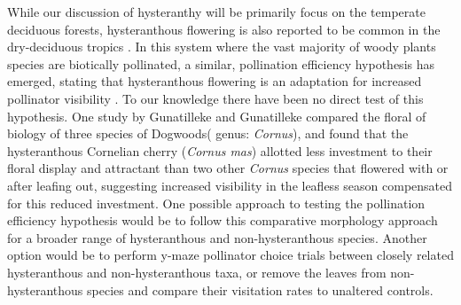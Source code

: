 \documentclass{article}\usepackage[]{graphicx}\usepackage[]{color}
\begin{document}
\indent While our discussion of hysteranthy will be primarily focus on the temperate deciduous forests, hysteranthous flowering is also reported to be common in the dry-deciduous tropics \citep{Janzen1967}. In this system where the vast majority of woody plants species are biotically pollinated, a similar, pollination efficiency hypothesis has emerged, stating that hysteranthous flowering is an adaptation for increased pollinator visibility \citep{Janzen1967}. To our knowledge there have been no direct test of this hypothesis. One study by Gunatilleke and Gunatilleke \citeyear{Guantilleke1984} compared the floral of biology of three species of Dogwoods( genus: \textit{Cornus}), and found that the hysteranthous Cornelian cherry (\textit{Cornus mas}) allotted less investment to their floral display and attractant than two other \textit{Cornus} species that flowered with or after leafing out, suggesting increased visibility in the leafless season compensated for this reduced investment. One possible approach to testing the pollination efficiency hypothesis would be to follow this comparative morphology approach for a broader range of hysteranthous and non-hysteranthous species. Another option would be to perform y-maze pollinator choice trials \citep{Giurfa1997} between closely related hysteranthous and non-hysteranthous taxa, or remove the leaves from non-hysteranthous species and compare their visitation rates to unaltered controls.\\
\end{document}
